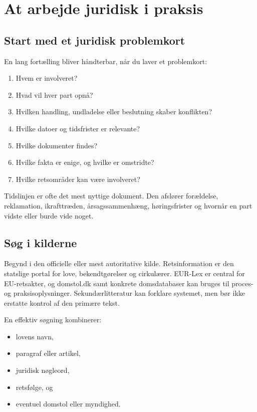 \chapter{At arbejde juridisk i praksis}


\section{Start med et juridisk problemkort}

En lang fortælling bliver håndterbar, når du laver et problemkort:
\begin{enumerate}
  \item Hvem er involveret?
  \item Hvad vil hver part opnå?
  \item Hvilken handling, undladelse eller beslutning skaber konflikten?
  \item Hvilke datoer og tidsfrister er relevante?
  \item Hvilke dokumenter findes?
  \item Hvilke fakta er enige, og hvilke er omstridte?
  \item Hvilke retsområder kan være involveret?
\end{enumerate}

Tidslinjen er ofte det mest nyttige dokument. Den afslører forældelse, reklamation, ikrafttræden, årsagssammenhæng, høringsfrister og hvornår en part vidste eller burde vide noget.

\section{Søg i kilderne}

Begynd i den officielle eller mest autoritative kilde. Retsinformation er den statslige portal for love, bekendtgørelser og cirkulærer. EUR-Lex er central for EU-retsakter, og domstol.dk samt konkrete domsdatabaser kan bruges til proces- og praksisoplysninger. Sekundærlitteratur kan forklare systemet, men bør ikke erstatte kontrol af den primære tekst.

En effektiv søgning kombinerer:
\begin{itemize}
  \item lovens navn,
  \item paragraf eller artikel,
  \item juridisk nøgleord,
  \item retsfølge, og
  \item eventuel domstol eller myndighed.
\end{itemize}

